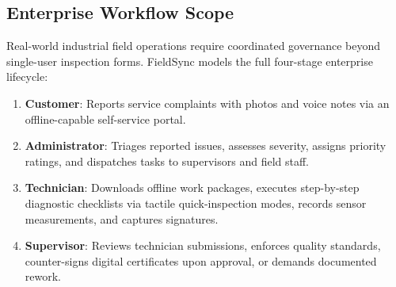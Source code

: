 \documentclass[conference]{IEEEtran}
\begin{document}
\subsection{Enterprise Workflow Scope}
Real-world industrial field operations require coordinated governance beyond single-user inspection forms. FieldSync models the full four-stage enterprise lifecycle:
\begin{enumerate}\setlength{\itemsep}{1pt}
    \item \textbf{Customer}: Reports service complaints with photos and voice notes via an offline-capable self-service portal.
    \item \textbf{Administrator}: Triages reported issues, assesses severity, assigns priority ratings, and dispatches tasks to supervisors and field staff.
    \item \textbf{Technician}: Downloads offline work packages, executes step-by-step diagnostic checklists via tactile quick-inspection modes, records sensor measurements, and captures signatures.
    \item \textbf{Supervisor}: Reviews technician submissions, enforces quality standards, counter-signs digital certificates upon approval, or demands documented rework.
\end{enumerate}
\end{document}
